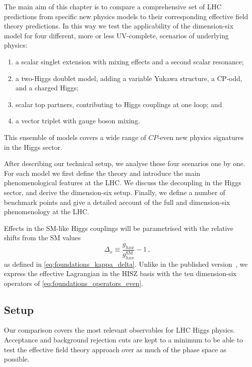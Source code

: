 The main aim of this chapter is to compare a comprehensive set of LHC
predictions from specific new physics models to their corresponding
effective field theory predictions. In this way we test the
applicability of the dimension-six model for four different, more or
less UV-complete, scenarios of underlying physics:
%
\begin{enumerate}
\item a scalar singlet extension with mixing effects and a second
  scalar resonance;
\item a two-Higgs doublet model, adding a variable Yukawa structure, a
  CP-odd, and a charged Higgs;
\item scalar top partners, contributing to Higgs couplings at one
  loop; and
\item a vector triplet with gauge boson mixing.
\end{enumerate}
%
This ensemble of models covers a wide range of $CP$-even new physics
signatures in the Higgs sector.

After describing our technical setup, we analyse these four scenarios
one by one. For each model we first define the theory and introduce
the main phenomenological features at the LHC. We discuss the
decoupling in the Higgs sector, and derive the dimension-six
setup. Finally, we define a number of benchmark points and give a
detailed account of the full and dimension-six phenomenology at the
LHC.

Effects in the SM-like Higgs couplings will be parametrised with the
relative shifts from the SM values
%
\begin{equation}
  \Delta_x \equiv \frac {g_{hxx}} {g_{hxx}^{\text{SM}}} - 1\,,
\end{equation}
%
as defined in \autoref{eq:foundations_kappa_delta}. Unlike in the
published version~\cite{Brehmer:2015rna}, we express the effective
Lagrangian in the HISZ basis with the ten dimension-six operators of
\autoref{eq:foundations_operators_even}.



\subsection{Setup}

Our comparison covers the most relevant observables for LHC Higgs
physics. Acceptance and background rejection cuts are kept to a
minimum to be able to test the effective field theory approach over as
much of the phase space as possible.

